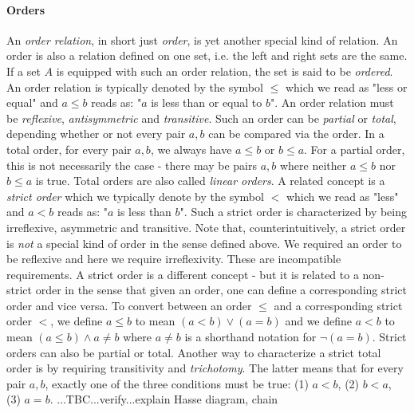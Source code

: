 \paragraph{Orders} \label{Par:Orders} An \emph{order relation}, in short just \emph{order}, is yet another special kind of relation. An order is also a relation defined on one set, i.e. the left and right sets are the same. If a set $A$ is equipped with such an order relation, the set is said to be \emph{ordered}. An order relation is typically denoted by the symbol $\leq$ which we read as "less or equal" and $a \leq b$ reads as: "$a$ is less than or equal to $b$". An order relation must be \emph{reflexive}, \emph{antisymmetric} and \emph{transitive}. Such an order can be \emph{partial} or \emph{total}, depending whether or not every pair $a,b$ can be compared via the order. In a total order, for every pair $a,b$, we always have $a \leq b$ or $b \leq a$. For a partial order, this is not necessarily the case - there may be pairs $a,b$ where neither $a \leq b$ nor $b \leq a$ is true. Total orders are also called \emph{linear orders}. A related concept is a \emph{strict order} which we typically denote by the symbol $<$ which we read as "less" and $a < b$ reads as: "$a$ is less than $b$". Such a strict order is characterized by being irreflexive, asymmetric and transitive. Note that, counterintuitively, a strict order is \emph{not} a special kind of order in the sense defined above. We required an order to be reflexive and here we require irreflexivity. These are incompatible requirements. A strict order is a different concept - but it is related to a non-strict order in the sense that given an order, one can define a corresponding strict order and vice versa. To convert between an order $\leq$ and a corresponding strict order $<$, we define $a \leq b$ to mean $(a < b) \vee (a = b)$ and we define $a < b$ to mean $(a \leq b) \wedge a \neq b$ where $a \neq b$ is a shorthand notation for $\neg (a = b)$. Strict orders can also be partial or total. Another way to characterize a strict total order is by requiring transitivity and \emph{trichotomy}. The latter means that for every pair $a,b$, exactly one of the three conditions must be true: (1) $a < b$, (2) $b < a$, (3) $a = b$.
 ...TBC...verify...explain Hasse diagram, chain
 



